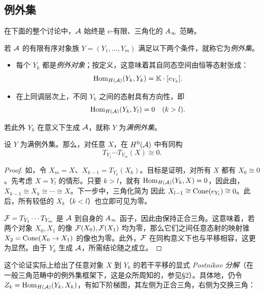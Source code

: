 \subsection{例外集}\label{sec:5i}
在下面的整个讨论中，$\mathcal A$ 始终是 c-有限、三角化的 $A_\infty$ 范畴。
\begin{definition*}
若 $\mathcal A$ 的有限有序对象族 $Y=(Y_1,\ldots,Y_m)$ 满足以下两个条件，就称它为\emph{例外集}。
\begin{itemize}
\item 每个 $Y_k$ 都是\emph{例外对象}；按定义，这意味着其自同态空间由恒等态射张成：
\[
\operatorname{Hom}_{H(\mathcal A)}(Y_k,Y_k)=\mathbb K\cdot[e_{Y_k}].
\]
\item 在上同调层次上，不同 $Y_k$ 之间的态射具有方向性，即
\[
\operatorname{Hom}_{H(\mathcal A)}(Y_k,Y_l)=0\quad(k>l).
\]
\end{itemize}
若此外 $Y_k$ 在意义下生成 $\mathcal A$，就称 $Y$ 为\emph{满例外集}。
\end{definition*}
\begin{lemma}\label{st:5.13}
设 $Y$ 为满例外集。那么，对任意 $X$，在 $H^0(\mathcal A)$ 中有同构
\[
T_{Y_1}\cdots T_{Y_m}(X)\cong0.
\]
\end{lemma}
\begin{proof}
如，令 $X_m=X$、$X_{k-1}=T_{Y_k}(X_k)$。目标是证明，对所有 $X$ 都有 $X_0\cong0$。先考虑 $X=Y_l$ 的情形。只要 $k>l$，就有 $\operatorname{Hom}_{H(\mathcal A)}(Y_k,X)=0$，因此由，$X_{k-1}\cong X_k\cong\cdots\cong X$。下一步中，三角化简为
因此 $X_{l-1}\cong\operatorname{Cone}(e_{Y_l})\cong0$。此后，所有较低的 $X_k$（$k<l$）也立即可见为零。

$\mathcal F=T_{Y_1}\cdots T_{Y_m}$ 是 $\mathcal A$ 到自身的 $A_\infty$ 函子，因此由保持正合三角。这意味着，若两个对象 $X_0,X_1$ 的像 $\mathcal F(X_0),\mathcal F(X_1)$ 均为零，那么它们之间任意态射的映射锥 $X_2=\operatorname{Cone}(X_0\to X_1)$ 的像也为零。此外，$\mathcal F$ 在同构意义下也与平移相容，这更为显然。由于 $Y_k$ 生成 $\mathcal A$，所需结论随之成立。
\end{proof}
这个论证实际上给出了任意对象 $X$ 到 $Y_k$ 的若干平移的显式 \emph{Postnikov 分解}（在一般三角范畴中的例外集框架下，这是众所周知的，参见§2）。具体地，仍令 $Z_k=\operatorname{Hom}_{H(\mathcal A)}(Y_k,X_k)$，有如下阶梯图，其左侧为正合三角，右侧为交换三角：
